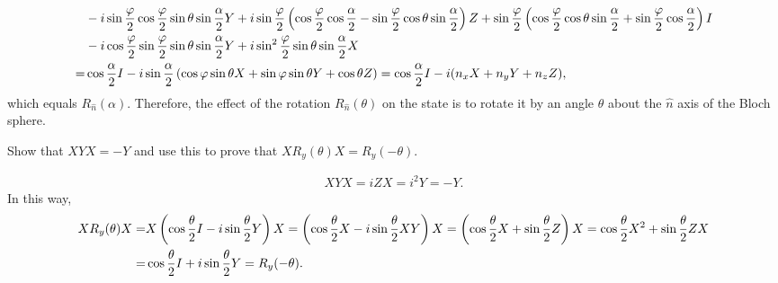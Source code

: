 \documentclass[en]{sol-man}
\begin{document}
\begin{pf}
\begin{align}
        \notag&-i\sin\frac{\varphi}{2}\cos\frac{\varphi}{2}\sin\theta\sin\frac{\alpha}{2}Y+i\sin\frac{\varphi}{2}\left(\cos\frac{\varphi}{2}\cos\frac{\alpha}{2}-\sin\frac{\varphi}{2}\cos\theta\sin\frac{\alpha}{2}\right)Z+\sin\frac{\varphi}{2}\left(\cos\frac{\varphi}{2}\cos\theta\sin\frac{\alpha}{2}+\sin\frac{\varphi}{2}\cos\frac{\alpha}{2}\right)I\\
        \notag&-i\cos\frac{\varphi}{2}\sin\frac{\varphi}{2}\sin\theta\sin\frac{\alpha}{2}Y+i\sin^2\frac{\varphi}{2}\sin\theta\sin\frac{\alpha}{2}X\\
        =&\cos\frac{\alpha}{2}I-i\sin\frac{\alpha}{2}\left(\cos\varphi\sin\theta X+\sin\varphi\sin\theta Y+\cos\theta Z\right)=\cos\frac{\alpha}{2}I-i(n_xX+n_yY+n_zZ),
    \end{align}
    which equals $R_{\hat{n}}(\alpha)$.
    Therefore, the effect of the rotation $R_{\hat{n}}(\theta)$ on the state is to rotate it by an angle $\theta$ about the $\hat{n}$ axis of the Bloch sphere.
\end{pf}

\begin{exe}
    Show that $XYX=-Y$ and use this to prove that $XR_y(\theta)X=R_y(-\theta)$.
\end{exe}
\begin{pf}
    \begin{align}
        XYX=iZX=i^2Y=-Y.
    \end{align}
    In this way,
    \begin{align}
        \notag XR_y(\theta)X=&X\left(\cos\frac{\theta}{2}I-i\sin\frac{\theta}{2}Y\right)X=\left(\cos\frac{\theta}{2}X-i\sin\frac{\theta}{2}XY\right)X=\left(\cos\frac{\theta}{2}X+\sin\frac{\theta}{2}Z\right)X=\cos\frac{\theta}{2}X^2+\sin\frac{\theta}{2}ZX\\
        =&\cos\frac{\theta}{2}I+i\sin\frac{\theta}{2}Y=R_y(-\theta).
    \end{align}
\end{pf}
\end{document}
